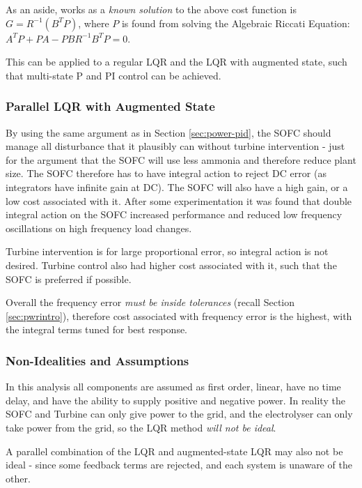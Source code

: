 As an aside,  works as a \emph{known solution} to the above cost function is $G = R^{-1} ( B^T P)$, where $P$ is found from solving the Algebraic Riccati Equation: $A^T P + PA - PBR^{-1}B^TP = 0$. \cite{power:controlman}

This can be applied to a regular LQR and the LQR with augmented state, such that multi-state P and PI control can be achieved.

\subsubsection{Parallel LQR with Augmented State}

By using the same argument as in Section \ref{sec:power-pid}, the SOFC should manage all disturbance that it plausibly can without turbine intervention - just for the argument that the SOFC will use less ammonia and therefore reduce plant size.
The SOFC therefore has to have integral action to reject DC error (as integrators have infinite gain at DC).
The SOFC will also have a high gain, or a low cost associated with it.
After some experimentation it was found that double integral action on the SOFC increased performance and reduced low frequency oscillations on high frequency load changes.

Turbine intervention is for large proportional error, so integral action is not desired.
Turbine control also had higher cost associated with it, such that the SOFC is preferred if possible.

Overall the frequency error \emph{must be inside tolerances} (recall Section \ref{sec:pwrintro}), therefore cost associated with frequency error is the highest, with the integral terms tuned for best response.


\subsubsection{Non-Idealities and Assumptions}

In this analysis all components are assumed as first order, linear, have no time delay, and have the ability to supply positive and negative power.
In reality the SOFC and Turbine can only give power to the grid, and the electrolyser can only take power from the grid, so the LQR method \emph{will not be ideal}.

A parallel combination of the LQR and augmented-state LQR may also not be ideal - since some feedback terms are rejected, and each system is unaware of the other.

